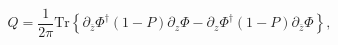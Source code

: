 \begin{equation}
Q=\frac{1}{2\pi}\text{Tr}\left\{ \partial_{\bar{z}}\Phi^{\dagger}\left(
1-P\right) \partial_{z}\Phi-\partial_{z}\Phi^{\dagger}\left( 1-P\right)
\partial_{\bar{z}}\Phi\right\} , \label{Q2}%
\end{equation}

